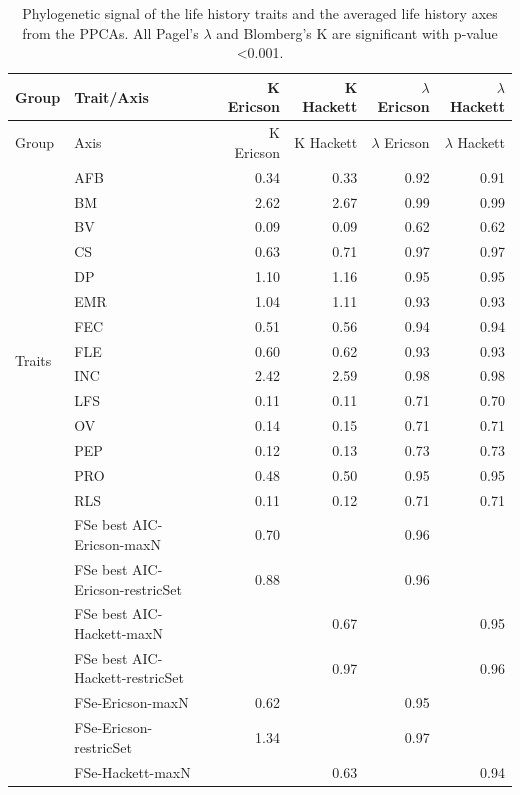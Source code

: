 \clearpage%
\begin{footnotesize}
\begin{longtable}{@{}ll|rr|rr@{}}
\caption[Phylogenetic signal]{
Phylogenetic signal of the life history traits and the averaged life history
axes from the PPCAs. All Pagel's $\lambda$ and Blomberg's K are significant with
p-value \textless{0.001}.}
\label{tab:tabApp2.7}\\

\toprule
Group & Trait/Axis & K Ericson & K Hackett & $\lambda$ Ericson & $\lambda$ Hackett\\
\midrule
\endfirsthead
\toprule
Group & Axis & K Ericson & K Hackett & $\lambda$ Ericson & $\lambda$ Hackett\\
\midrule
\endhead
\multirow{15}{*}{Traits} & AFB & 0.34 & 0.33 & 0.92 & 0.91\\
 & BM & 2.62 & 2.67 & 0.99 & 0.99\\
 & BV & 0.09 & 0.09 & 0.62 & 0.62\\
 & CS & 0.63 & 0.71 & 0.97 & 0.97\\
 & DP & 1.10 & 1.16 & 0.95 & 0.95\\
 & EMR & 1.04 & 1.11 & 0.93 & 0.93\\
 & FEC & 0.51 & 0.56 & 0.94 & 0.94\\
 & FLE & 0.60 & 0.62 & 0.93 & 0.93\\
 & INC & 2.42 & 2.59 & 0.98 & 0.98\\
 & LFS & 0.11 & 0.11 & 0.71 & 0.70\\
 & OV & 0.14 & 0.15 & 0.71 & 0.71\\
 & PEP & 0.12 & 0.13 & 0.73 & 0.73\\
 & PRO & 0.48 & 0.50 & 0.95 & 0.95\\
 & RLS & 0.11 & 0.12 & 0.71 & 0.71\\
\addlinespace
\multirow{8}{*}{FSe} & FSe best AIC-Ericson-maxN & 0.70 &      & 0.96 &     \\
 & FSe best AIC-Ericson-restricSet & 0.88 &      & 0.96 &     \\
 & FSe best AIC-Hackett-maxN &      & 0.67 &      & 0.95\\
 & FSe best AIC-Hackett-restricSet &      & 0.97 &      & 0.96\\
 & FSe-Ericson-maxN & 0.62 &      & 0.95 &     \\
 & FSe-Ericson-restricSet & 1.34 &      & 0.97 &     \\
 & FSe-Hackett-maxN &      & 0.63 &      & 0.94\\

\end{longtable}
\end{footnotesize}
